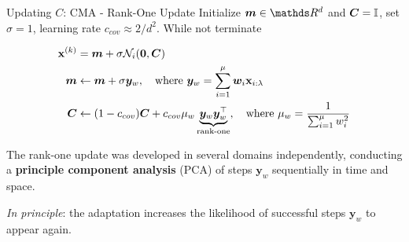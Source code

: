 \documentclass[11pt,compress,t,notes=noshow, xcolor=table]{beamer}
\begin{document}
\begin{vbframe}{Updating $C$: CMA - Rank-One Update}
Initialize $\bm{m} \in \R^d$ and $\bm{C} = \bm{\mathbb{I}}$, set $\sigma = 1$, learning rate $c_{cov} \approx 2/d^2$. While not terminate

\begin{align*}
\mathbf{x}^{(k)} &= \bm{m} + \sigma \mathcal{N}_i(\bm{0}, \bm{C}) \\
\bm{m} &\leftarrow \bm{m} + \sigma \bm{y}_w, \quad \text{where } \bm{y}_w = \sum_{i=1}^\mu \bm{w}_i\mathbf{x}_{i:\lambda} \\
\bm{C} &\leftarrow (1-c_{cov}) \bm{C} + c_{cov}\mu_w \underbrace{\bm{y}_w\bm{y}_w^\top}_{\text{rank-one}}, \quad \text{where } \mu_w = \frac{1}{\sum_{i=1}^\mu w_i^2}
\end{align*}

The rank-one update was developed in several domains independently, conducting a \textbf{principle component analysis} (PCA) of steps $\bm{y}_w$ sequentially in time and space.

\lz

\textit{In principle}: the adaptation increases the likelihood of successful steps $\bm{y}_w$ to appear again.





\end{vbframe}
\end{document}
